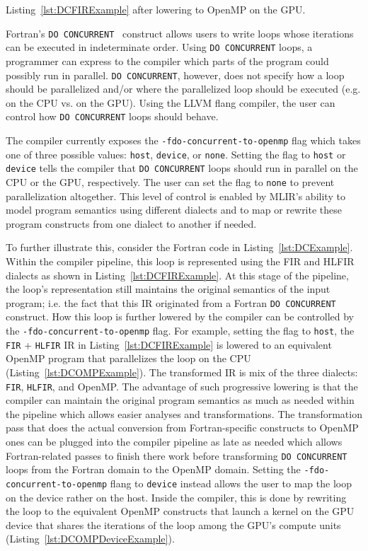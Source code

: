 \documentclass[acmtog,natbib=false]{acmart}
\newcommand{\code}[1]{\texttt{#1}\xspace}
\begin{document}
\begin{listing}[t]
\inputminted{MLIR-lexer.py:MlirLexer -x}{code/dc_omp_device.mlir}
\caption{Listing~\ref{lst:DCFIRExample} after lowering to OpenMP on the GPU.}
\label{lst:DCOMPDeviceExample}
\end{listing}

Fortran's \code{DO CONCURRENT}~\cite{F2023} construct allows users to write loops whose iterations can be executed in indeterminate order.
Using \code{DO CONCURRENT} loops, a programmer can express to the compiler which parts of the program could possibly run in parallel.
\code{DO CONCURRENT}, however, does not specify how a loop should be parallelized and/or where the parallelized loop should be executed (e.g. on the CPU vs. on the GPU).
Using the LLVM flang compiler, the user can control how \code{DO CONCURRENT} loops should behave.

The compiler currently exposes the \code{-fdo-concurrent-to-openmp} flag which takes one of three possible values: \code{host}, \code{device}, or \code{none}.
Setting the flag to \code{host} or \code{device} tells the compiler that \code{DO CONCURRENT} loops should run in parallel on the CPU or the GPU, respectively.
The user can set the flag to \code{none} to prevent parallelization altogether.
This level of control is enabled by \ac{MLIR}'s ability to model program semantics using different dialects and to map or rewrite these program constructs from one dialect to another if needed.

To further illustrate this, consider the Fortran code in Listing~\ref{lst:DCExample}.
Within the compiler pipeline, this loop is represented using the \ac{FIR} and \ac{HLFIR} dialects as shown in Listing~\ref{lst:DCFIRExample}.
At this stage of the pipeline, the loop's representation still maintains the original semantics of the input program; i.e. the fact that this IR originated from a Fortran \code{DO CONCURRENT} construct.
How this loop is further lowered by the compiler can be controlled by the \code{-fdo-concurrent-to-openmp} flag.
For example, setting the flag to \code{host}, the \code{FIR} + \code{HLFIR} IR in Listing~\ref{lst:DCFIRExample} is lowered to an equivalent OpenMP program that parallelizes the loop on the CPU (Listing~\ref{lst:DCOMPExample}).
The transformed IR is mix of the three dialects: \code{FIR}, \code{HLFIR}, and OpenMP.
The advantage of such progressive lowering is that the compiler can maintain the original program semantics as much as needed within the pipeline which allows easier analyses and transformations.
The transformation pass that does the actual conversion from Fortran-specific constructs to OpenMP ones can be plugged into the compiler pipeline as late as needed which allows Fortran-related passes to finish there work before transforming \code{DO CONCURRENT} loops from the Fortran domain to the OpenMP domain.
Setting the \code{-fdo-concurrent-to-openmp} flang to \code{device} instead allows the user to map the loop on the device rather on the host.
Inside the compiler, this is done by rewriting the loop to the equivalent OpenMP constructs that launch a kernel on the GPU device that shares the iterations of the loop among the GPU's compute units (Listing~\ref{lst:DCOMPDeviceExample}).
\end{document}
